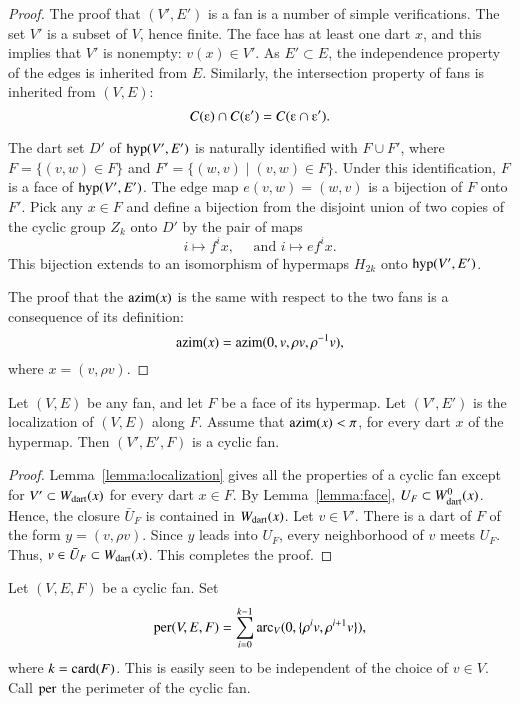 \begin{proof}
The proof that  $(V',E')$ is a fan is a number of simple verifications.
The set $V'$ is a subset of $V$, hence finite.  The face has at least one dart $x$, and this implies that $V'$ is nonempty: $v(x)\in V'$.  As $E'\subset E$, the independence property of the edges is inherited from $E$.  Similarly, the intersection property of fans is inherited from $(V,E)$:
$$
C(\e)\cap C(\e') = C(\e\cap \e').
$$

The dart set $D'$ of ${\operatorname{hyp}}(V',E')$ is naturally identified with $F\cup F'$, where
$F = \{(v,w) \in F\}$ and $F'=\{(w,v) \mid (v,w)\in F\}$.  Under this identification, $F$ is a face of ${\operatorname{hyp}}(V',E')$.  The edge map $e(v,w)= (w,v)$ is a bijection of $F$ onto $F'$.   Pick any $x\in F$ and
define a bijection from the disjoint union of two copies of the cyclic group $Z_k$ onto $D'$  by 
the pair of maps
$$
i \mapsto f^i x,\quad\text{ and } i\mapsto e f^i x.
$$
This bijection extends to an isomorphism of hypermaps $H_{2k}$ onto ${\operatorname{hyp}}(V',E')$.

The proof that the ${\operatorname{azim}}(x)$ is the same with respect to the two fans is a consequence of its definition:
$$
{\operatorname{azim}}(x) = {\operatorname{azim}}(0,v,\rho v,\rho^{-1} v),
$$
where $x = (v,\rho v)$.  
\end{proof}

\begin{lemma} 
Let $(V,E)$ be any fan, and let $F$ be a face of its hypermap.  Let $(V',E')$ is
the localization of $(V,E)$ along $F$.
Assume that ${\operatorname{azim}}(x)<\pi$, for every dart $x$ of the hypermap.
Then $(V',E',F)$ is a cyclic fan. 
\end{lemma}

\begin{proof}
Lemma~\ref{lemma:localization} gives all the properties of a cyclic fan except for
$V'\subset W_{\text{dart}}(x)$ for every dart
$x\in F$.    By Lemma~\ref{lemma:face},  $U_F \subset W^0_{\text{dart}}(x)$.  Hence, the
closure $\bar U_F$ is contained in $W_{\text{dart}}(x)$.  Let $v\in V'$.  There is a dart
of $F$ of the form $y=(v,\rho v)$.  Since $y$ leads into $U_F$, every neighborhood of
$v$ meets $U_F$.  Thus, $v\in \bar U_F\subset W_{\text{dart}}(x)$.  This completes
the proof.
\end{proof}


\begin{definition}[perimeter]\label{lemma:perim}
Let $(V,E,F)$ be a cyclic fan.    Set
$$
{\operatorname{per}}(V,E,F) = \sum_{i=0}^{k-1} \operatorname{arc}_V(0,\{\rho^i v,\rho^{i+1} v\}), 
$$
where  $k={\operatorname{card}}(F)$.
This is easily seen to be independent of the choice of $v\in V$.  Call ${\operatorname{per}}$ the perimeter of the cyclic fan.
\end{definition}


